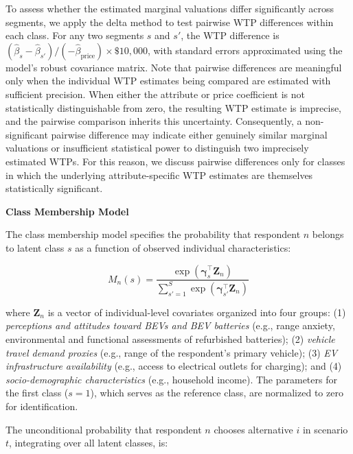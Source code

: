 \documentclass[a4paper,fleqn]{cas-sc}   %
\begin{document}
To assess whether the estimated marginal valuations differ significantly across segments, we apply the delta method to test pairwise WTP differences within each class. For any two segments $s$ and $s'$, the WTP difference is $(\hat{\beta}_s - \hat{\beta}_{s'}) / (-\hat{\beta}_{\text{price}}) \times \$10{,}000$, with standard errors approximated using the model's robust covariance matrix. Note that pairwise differences are meaningful only when the individual WTP estimates being compared are estimated with sufficient precision. When either the attribute or price coefficient is not statistically distinguishable from zero, the resulting WTP estimate is imprecise, and the pairwise comparison inherits this uncertainty. Consequently, a non-significant pairwise difference may indicate either genuinely similar marginal valuations or insufficient statistical power to distinguish two imprecisely estimated WTPs. For this reason, we discuss pairwise differences only for classes in which the underlying attribute-specific WTP estimates are themselves statistically significant.

\vspace{\baselineskip}
\noindent \textbf{Class Membership Model} \par

The class membership model specifies the probability that respondent $n$ belongs to latent class $s$ as a function of observed individual characteristics:

\begin{equation}
    M_n(s) = \frac{\exp\!\left(\boldsymbol{\gamma}_s^{\top} \mathbf{Z}_n\right)}{\displaystyle\sum_{s'=1}^{S} \exp\!\left(\boldsymbol{\gamma}_{s'}^{\top} \mathbf{Z}_n\right)}
    \label{eq:membership}
\end{equation}

\noindent where $\mathbf{Z}_n$ is a vector of individual-level covariates organized into four groups: (1) \textit{perceptions and attitudes toward BEVs and BEV batteries} (e.g., range anxiety, environmental and functional assessments of refurbished batteries); (2) \textit{vehicle travel demand proxies} (e.g., range of the respondent's primary vehicle); (3) \textit{EV infrastructure availability} (e.g., access to electrical outlets for charging); and (4) \textit{socio-demographic characteristics} (e.g., household income). The parameters for the first class ($s = 1$), which serves as the reference class, are normalized to zero for identification.

The unconditional probability that respondent $n$ chooses alternative $i$ in scenario $t$, integrating over all latent classes, is:
\end{document}
